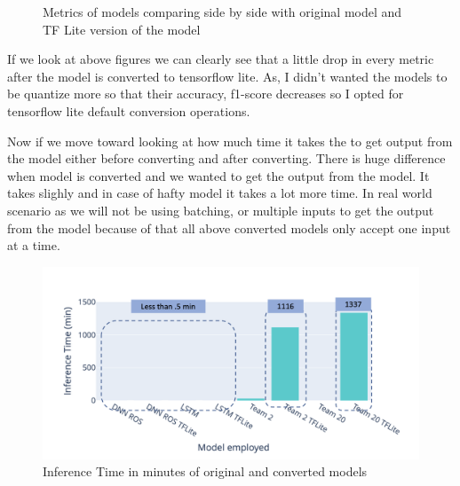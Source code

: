 \begin{figure}[H]
\caption{Metrics of models comparing side by side with original model and TF Lite version of the model}
\label{metricsafterconversion}
\end{figure}

If we look at above figures we can clearly see that a little drop in every metric after the model is converted to tensorflow lite. As, I didn't wanted the models to be quantize more so that their accuracy, f1-score decreases so I opted for tensorflow lite default conversion operations. 


Now if we move toward looking at how much time it takes the to get output from the model either before converting and after converting. There is huge difference when model is converted and we wanted to get the output from the model. It takes slighly and in case of hafty model it takes a lot more time. In real world scenario as we will not be using batching, or multiple inputs to get the output from the model because of that all above converted models only accept one input at a time. 

\begin{figure}[H]
\centering
\includegraphics[scale=0.45]{img/inference_time_of_converted_models.png}
\caption{Inference Time in minutes of original and converted models}
\label{inference_time_of_converted_models}
\end{figure}

